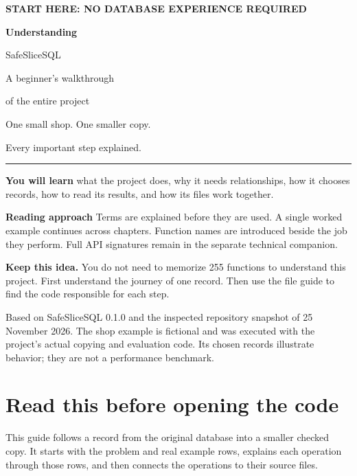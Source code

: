 \documentclass[12pt,a4paper,oneside]{report}
\newcommand{\reviewpoint}[1]{\par\begingroup\setlength{\fboxsep}{9pt}\noindent\colorbox{wash}{\parbox{\dimexpr\linewidth-18pt\relax}{\textbf{Keep this idea.} #1}}\endgroup\par}
\begin{document}
\hypersetup{pageanchor=false}
\begin{titlepage}
\thispagestyle{empty}
\vspace*{12mm}
{\sffamily\large\bfseries\color{teal}START HERE: NO DATABASE EXPERIENCE REQUIRED\par}
\vspace{14mm}
{\sffamily\fontsize{34}{41}\selectfont\bfseries\color{navy}Understanding\par SafeSliceSQL\par}
\vspace{8mm}
{\sffamily\Large A beginner's walkthrough\par of the entire project\par}
\vspace{12mm}
{\Large One small shop. One smaller copy.\par Every important step explained.\par}
\vspace{10mm}
\rule{\linewidth}{0.5pt}
\textbf{You will learn} what the project does, why it needs relationships, how it chooses records, how to read its results, and how its files work together.

\textbf{Reading approach} Terms are explained before they are used. A single worked example continues across chapters. Function names are introduced beside the job they perform. Full API signatures remain in the separate technical companion.
\vfill
\reviewpoint{You do not need to memorize 255 functions to understand this project. First understand the journey of one record. Then use the file guide to find the code responsible for each step.}
\vspace{5mm}
{\small Based on SafeSliceSQL 0.1.0 and the inspected repository snapshot of 25 November 2026. The shop example is fictional and was executed with the project's actual copying and evaluation code. Its chosen records illustrate behavior; they are not a performance benchmark.\par}
\end{titlepage}
\hypersetup{pageanchor=true}

\chapter*{Read this before opening the code}
This guide follows a record from the original database into a smaller checked copy. It starts with the problem and real example rows, explains each operation through those rows, and then connects the operations to their source files.
\end{document}
